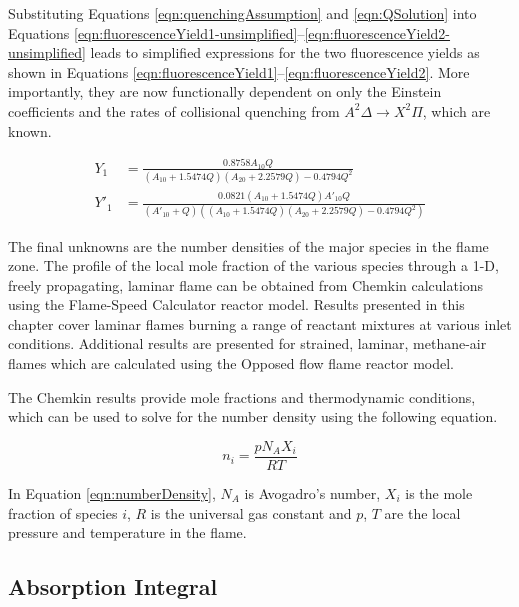 Substituting Equations \ref{eqn:quenchingAssumption} and \ref{eqn:QSolution} into Equations \ref{eqn:fluorescenceYield1-unsimplified}--\ref{eqn:fluorescenceYield2-unsimplified} leads to simplified expressions for the two fluorescence yields as shown in Equations \ref{eqn:fluorescenceYield1}--\ref{eqn:fluorescenceYield2}.
More importantly, they are now functionally dependent on only the Einstein coefficients and the rates of collisional quenching from \(A^2\Delta\rightarrow X^2\Pi\), which are known.

\begin{align}
  Y_1 &= \frac{ 0.8758 A_{10} Q }{ ( A_{10} + 1.5474 Q )( A_{20} + 2.2579 Q ) - 0.4794 Q^2 }
  \label{eqn:fluorescenceYield1}\\
  Y'_1 &= \frac{ 0.0821 ( A_{10} + 1.5474 Q ) A'_{10} Q }{ ( A'_{10} + Q ) \left( ( A_{10} + 1.5474 Q )( A_{20} + 2.2579 Q ) - 0.4794 Q^2 \right) }
  \label{eqn:fluorescenceYield2}
\end{align}

The final unknowns are the number densities of the major species in the flame zone.
The profile of the local mole fraction of the various species through a 1-D, freely propagating, laminar flame can be obtained from Chemkin calculations using the Flame-Speed Calculator reactor model.
Results presented in this chapter cover laminar flames burning a range of reactant mixtures at various inlet conditions.
Additional results are presented for strained, laminar, methane-air flames which are calculated using the Opposed flow flame reactor model.

The Chemkin results provide mole fractions and thermodynamic conditions, which can be used to solve for the number density using the following equation.

\begin{equation}
  n_i = \frac{pN_AX_i}{RT}
  \label{eqn:numberDensity}
\end{equation}

In Equation \ref{eqn:numberDensity}, \(N_A\) is Avogadro's number, \(X_i\) is the mole fraction of species \(i\), \(R\) is the universal gas constant and \(p\), \(T\) are the local pressure and temperature in the flame.


\subsection{Absorption Integral}


